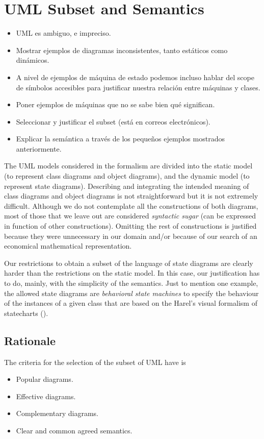 \section{UML Subset and Semantics}
\label{sec:umlsubset}

\begin{itemize}
\item UML es ambiguo, e impreciso.
\item Mostrar ejemplos de diagramas inconsistentes, tanto estáticos
  como dinámicos.
\item A nivel de ejemplos de máquina de estado podemos incluso hablar
  del scope de símbolos accesibles para justificar nuestra relación
  entre máquinas y clases.
\item Poner ejemplos de máquinas que no se sabe bien qué significan.
\item Seleccionar y justificar el subset (está en correos electrónicos).
\item Explicar la semántica a través de los pequeños ejemplos
  mostrados anteriormente.
\end{itemize}

The UML models considered in the formalism are divided into the static
model (to represent class diagrams and object diagrams), and the
dynamic model (to represent state diagrams). Describing and
integrating the intended meaning of class diagrams and object diagrams
is not straightforward but it is not extremely difficult. Although we
do not contemplate all the constructions of both diagrams, most of
those that we leave out are considered \emph{syntactic sugar} (can be
expressed in function of other constructions). Omitting the rest of
constructions is justified because they were unnecessary in our domain
and/or because of our search of an economical mathematical
representation.

Our restrictions to obtain a subset of the language of state diagrams
are clearly harder than the restrictions on the static model. In this
case, our justification has to do, mainly, with the simplicity of the
semantics. Just to mention one example, the allowed state diagrams are
\emph{behavioral state machines} to specify the behaviour of the
instances of a given class that are based on the Harel's visual
formalism of statecharts (\cite{harel}).

\subsection{Rationale}
The criteria for the selection of the subset of UML have is
\begin{itemize}
\item Popular diagrams.
\item Effective diagrams.
\item Complementary diagrams.
\item Clear and common agreed semantics.
\end{itemize}

